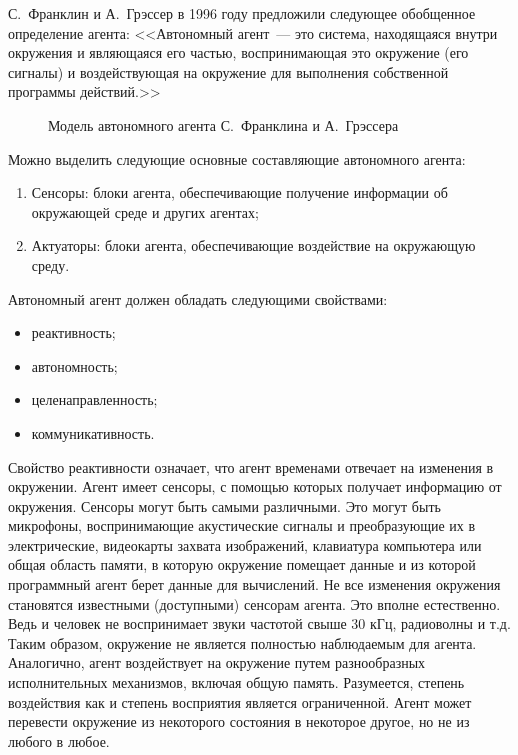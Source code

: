С.~Франклин и А.~Грэссер в 1996 году предложили следующее обобщенное определение агента: <<Автономный агент~--- это система, находящаяся внутри окружения и являющаяся его частью, воспринимающая это окружение (его сигналы) и воздействующая на окружение для выполнения собственной программы действий.>>
\begin{figure}[h]
\caption{Модель автономного агента С.~Франклина и А.~Грэссера}
\label{1:franklin-agent}
\end{figure}

Можно выделить следующие основные составляющие автономного агента:
\begin{enumerate}
\item Сенсоры: блоки агента, обеспечивающие получение информации об окружающей среде и других агентах;
\item Актуаторы: блоки агента, обеспечивающие воздействие на окружающую среду.
\end{enumerate}

Автономный агент должен обладать следующими свойствами:
\begin{itemize}
\item реактивность;
\item автономность;
\item целенаправленность;
\item коммуникативность.
\end{itemize}

Свойство реактивности означает, что агент временами отвечает на изменения в окружении. Агент имеет сенсоры, с помощью которых получает информацию от окружения. Сенсоры могут быть самыми различными. Это могут быть микрофоны, воспринимающие акустические сигналы и преобразующие их в электрические, видеокарты захвата изображений, клавиатура компьютера или общая область памяти, в которую окружение помещает данные и из которой программный агент берет данные для вычислений. Не все изменения окружения становятся известными (доступными) сенсорам агента. Это вполне естественно. Ведь и человек не воспринимает звуки частотой свыше 30 кГц, радиоволны и т.д. Таким образом, окружение не является полностью наблюдаемым для агента. Аналогично, агент воздействует на окружение путем разнообразных исполнительных механизмов, включая общую память. Разумеется, степень воздействия как и степень восприятия является ограниченной. Агент может перевести окружение из некоторого состояния в некоторое другое, но не из любого в любое.

